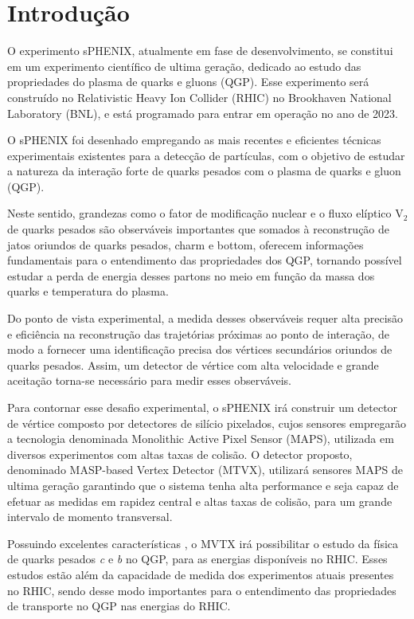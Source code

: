 \chapter{Introdução}

O experimento sPHENIX, atualmente em fase de desenvolvimento, se constitui em um experimento científico de ultima geração, dedicado ao estudo das propriedades do plasma de quarks e gluons (QGP). Esse experimento será construído no Relativistic Heavy Ion Collider (RHIC) no Brookhaven National Laboratory (BNL), e está programado para entrar em operação no ano de 2023.

O sPHENIX foi desenhado empregando as mais recentes e eficientes técnicas experimentais existentes para a detecção de partículas, com o objetivo de estudar a natureza da interação forte de quarks pesados com o plasma de quarks e gluon (QGP). 

Neste sentido, grandezas como o fator de modificação nuclear e o fluxo elíptico V$_{2}$ de quarks pesados são observáveis importantes que somados à reconstrução de jatos oriundos de quarks pesados, charm e bottom, oferecem informações fundamentais para o entendimento das propriedades dos QGP, tornando possível estudar a perda de energia desses partons no meio em função da massa dos quarks e temperatura do plasma.

Do ponto de vista experimental, a medida desses observáveis requer alta precisão e eficiência na reconstrução das trajetórias próximas ao ponto de interação, de modo a fornecer uma identificação precisa dos vértices secundários oriundos de quarks pesados. Assim, um detector de vértice com alta velocidade e grande aceitação torna-se necessário para medir esses observáveis.  

Para contornar esse desafio experimental, o sPHENIX irá construir um detector de vértice composto por detectores de silício pixelados, cujos sensores empregarão a tecnologia denominada Monolithic Active Pixel Sensor (MAPS), utilizada em diversos experimentos com altas taxas de colisão. O detector proposto, denominado MASP-based Vertex Detector (MTVX), utilizará sensores MAPS de ultima geração garantindo que o sistema tenha alta performance e seja capaz de efetuar as medidas em rapidez central e altas taxas de colisão, para um grande intervalo de momento transversal.

Possuindo excelentes características , o MVTX irá possibilitar o estudo da física de quarks pesados \textit{c} e \textit{b} no QGP, para as energias disponíveis no RHIC. Esses estudos estão além da capacidade de medida dos experimentos atuais presentes no RHIC, sendo desse modo importantes para o entendimento das propriedades de transporte no QGP nas energias do RHIC.

